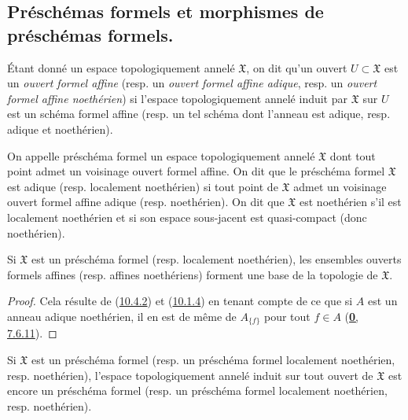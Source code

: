 \subsection{Préschémas formels et morphismes de préschémas formels.}
\label{subsection:I.10.4-fr}

\begin{env}[10.4.1]
\label{I.10.4.1-fr}
Étant donné un espace topologiquement annelé $\mathfrak{X}$, on dit qu'un
ouvert $U\subset\mathfrak{X}$ est un \emph{ouvert formel affine} (resp. un
\emph{ouvert formel affine adique}, resp. un \emph{ouvert formel affine
noethérien}) si l'espace topologiquement annelé induit par $\mathfrak{X}$
sur $U$ est un schéma formel affine (resp. un tel schéma dont l'anneau est
adique, resp. adique et noethérien).
\end{env}

\begin{definition}[10.4.2]
\label{I.10.4.2-fr}
On appelle préschéma formel un espace topologiquement annelé $\mathfrak{X}$
dont tout point admet un voisinage ouvert formel affine. On dit que le
préschéma formel $\mathfrak{X}$ est adique \textup{(resp.} localement noethérien) si
tout point de $\mathfrak{X}$ admet un voisinage ouvert formel affine adique
\textup{(resp.} noethérien). On dit que $\mathfrak{X}$ est noethérien s'il est
localement noethérien et si son espace sous-jacent est quasi-compact (donc
noethérien).
\end{definition}

\begin{proposition}[10.4.3]
\label{I.10.4.3-fr}
Si $\mathfrak{X}$ est un préschéma formel \textup{(resp.} localement noethérien),
les ensembles ouverts formels affines \textup{(resp.} affines noethériens) forment
une base de la topologie de $\mathfrak{X}$.
\end{proposition}

\begin{proof}
Cela résulte de (\hyperref[I.10.4.2-fr]{10.4.2}) et
(\hyperref[I.10.1.4-fr]{10.1.4}) en tenant compte de ce que si $A$ est un
anneau adique noethérien, il en est de même de $A_{\{f\}}$ pour tout
$f\in A$ (\hyperref[0.7.6.11-fr]{\textbf{0}, 7.6.11}).
\end{proof}

\begin{corollary}[10.4.4]
\label{I.10.4.4-fr}
Si $\mathfrak{X}$ est un préschéma formel \textup{(resp.} un préschéma formel
localement noethérien, \textup{resp.} noethérien), l'espace topologiquement annelé
induit sur tout ouvert de $\mathfrak{X}$ est encore un préschéma formel
\textup{(resp.} un préschéma formel localement noethérien, \textup{resp.} noethérien).
\end{corollary}

